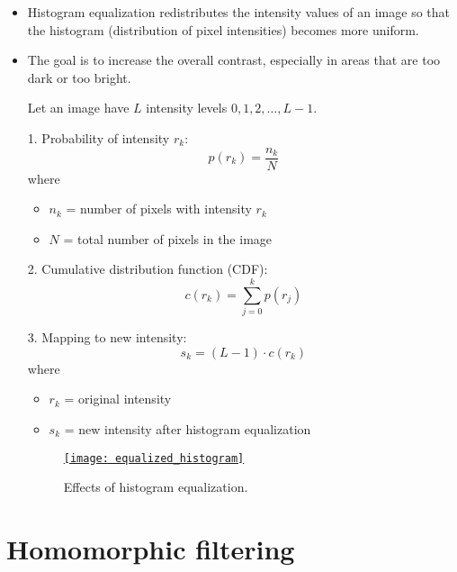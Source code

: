 \begin{itemize}
\item Histogram equalization \cite{gonzalez2009digital}
  redistributes the intensity values of an image so that the histogram
  (distribution of pixel intensities) becomes more uniform.
\item The goal is to increase the overall contrast, especially in
  areas that are too dark or too bright.

Let an image have $L$ intensity levels $0, 1, 2, \dots, L-1$.

1. Probability of intensity $r_k$:
\[
p(r_k) = \frac{n_k}{N}
\]
where 
\begin{itemize}
    \item $n_k$ = number of pixels with intensity $r_k$
    \item $N$ = total number of pixels in the image
\end{itemize}

2. Cumulative distribution function (CDF):
\[
c(r_k) = \sum_{j=0}^{k} p(r_j)
\]

3. Mapping to new intensity:
\[
s_k = (L-1) \cdot c(r_k)
\]
where 
\begin{itemize}
    \item $r_k$ = original intensity
    \item $s_k$ = new intensity after histogram equalization
\end{itemize}

\begin{figure}[H]
  \vspace{-0ex}
  \centering
  \href{https://github.com/vicente-gonzalez-ruiz/medical_imaging/blob/main/notebooks/equalized_histogram.ipynb}{\texttt{[image: equalized\_histogram]}}
  \caption{Effects of histogram equalization.}
  \label{fig:histogram_equalization}
\end{figure}

\end{itemize}


\section{Homomorphic filtering \cite{gonzalez2009digital}}

